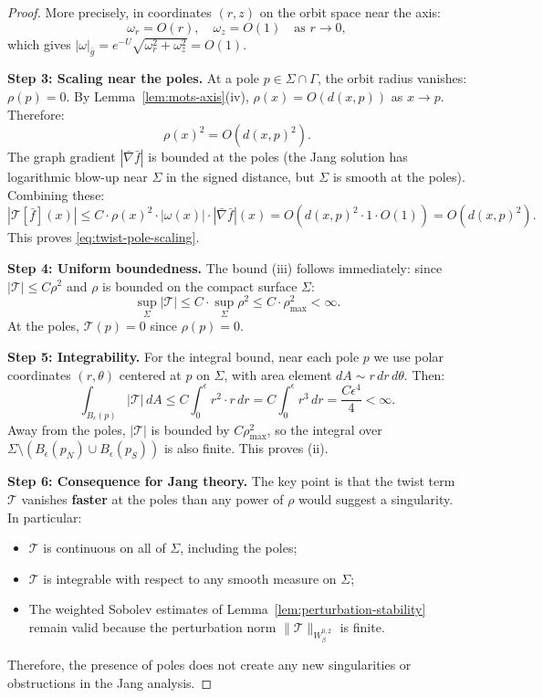 \documentclass[12pt]{article}
\theoremstyle{plain}
\theoremstyle{definition}
\theoremstyle{remark}
\begin{document}
\begin{proof}
More precisely, in coordinates $(r,z)$ on the orbit space near the axis:
\[
\omega_r = O(r), \quad \omega_z = O(1) \quad \text{as } r \to 0,
\]
which gives $|\omega|_{\bar{g}} = e^{-U}\sqrt{\omega_r^2 + \omega_z^2} = O(1)$.

\textbf{Step 3: Scaling near the poles.}
At a pole $p \in \Sigma \cap \Gamma$, the orbit radius vanishes: $\rho(p) = 0$. By Lemma~\ref{lem:mots-axis}(iv), $\rho(x) = O(d(x,p))$ as $x \to p$. Therefore:
\[
\rho(x)^2 = O(d(x,p)^2).
\]
The graph gradient $|\bar{\nabla}\bar{f}|$ is bounded at the poles (the Jang solution has logarithmic blow-up near $\Sigma$ in the signed distance, but $\Sigma$ is smooth at the poles). Combining these:
\begin{equation}\label{eq:twist-pole-scaling}
|\mathcal{T}[\bar{f}](x)| \leq C \cdot \rho(x)^2 \cdot |\omega(x)| \cdot |\bar{\nabla}\bar{f}|(x) = O(d(x,p)^2 \cdot 1 \cdot O(1)) = O(d(x,p)^2).
\end{equation}
This proves \eqref{eq:twist-pole-scaling}.

\textbf{Step 4: Uniform boundedness.}
The bound (iii) follows immediately: since $|\mathcal{T}| \leq C\rho^2$ and $\rho$ is bounded on the compact surface $\Sigma$:
\[
\sup_\Sigma |\mathcal{T}| \leq C \cdot \sup_\Sigma \rho^2 \leq C \cdot \rho_{\max}^2 < \infty.
\]
At the poles, $\mathcal{T}(p) = 0$ since $\rho(p) = 0$.

\textbf{Step 5: Integrability.}
For the integral bound, near each pole $p$ we use polar coordinates $(r, \theta)$ centered at $p$ on $\Sigma$, with area element $dA \sim r \, dr \, d\theta$. Then:
\[
\int_{B_\epsilon(p)} |\mathcal{T}| \, dA \leq C \int_0^\epsilon r^2 \cdot r \, dr = C \int_0^\epsilon r^3 \, dr = \frac{C\epsilon^4}{4} < \infty.
\]
Away from the poles, $|\mathcal{T}|$ is bounded by $C\rho_{\max}^2$, so the integral over $\Sigma \setminus (B_\epsilon(p_N) \cup B_\epsilon(p_S))$ is also finite. This proves (ii).

\textbf{Step 6: Consequence for Jang theory.}
The key point is that the twist term $\mathcal{T}$ vanishes \textbf{faster} at the poles than any power of $\rho$ would suggest a singularity. In particular:
\begin{itemize}
    \item $\mathcal{T}$ is continuous on all of $\Sigma$, including the poles;
    \item $\mathcal{T}$ is integrable with respect to any smooth measure on $\Sigma$;
    \item The weighted Sobolev estimates of Lemma~\ref{lem:perturbation-stability} remain valid because the perturbation norm $\|\mathcal{T}\|_{W^{0,2}_\beta}$ is finite.
\end{itemize}
Therefore, the presence of poles does not create any new singularities or obstructions in the Jang analysis.
\end{proof}
\end{document}
